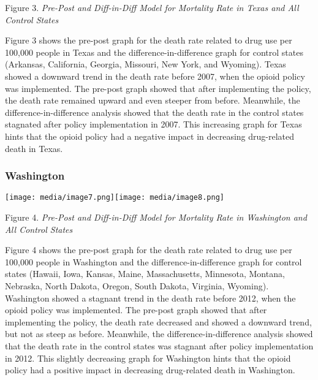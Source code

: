 \documentclass{article}
\begin{document}
Figure 3. \emph{Pre-Post and Diff-in-Diff Model for Mortality Rate in
Texas and All Control States}

Figure 3 shows the pre-post graph for the death rate related to drug use
per 100,000 people in Texas and the difference-in-difference graph for
control states (Arkansas, California, Georgia, Missouri, New York, and
Wyoming). Texas showed a downward trend in the death rate before 2007,
when the opioid policy was implemented. The pre-post graph showed that
after implementing the policy, the death rate remained upward and even
steeper from before. Meanwhile, the difference-in-difference analysis
showed that the death rate in the control states stagnated after policy
implementation in 2007. This increasing graph for Texas hints that the
opioid policy had a negative impact in decreasing drug-related death in
Texas.

\hypertarget{section}{%
\subsubsection{}\label{section}}

\hypertarget{washington}{%
\subsubsection{Washington}\label{washington}}

\texttt{[image: media/image7.png]}\texttt{[image: media/image8.png]}

Figure 4. \emph{Pre-Post and Diff-in-Diff Model for Mortality Rate in
Washington and All Control States}

Figure 4 shows the pre-post graph for the death rate related to drug use
per 100,000 people in Washington and the difference-in-difference graph
for control states (Hawaii, Iowa, Kansas, Maine, Massachusetts,
Minnesota, Montana, Nebraska, North Dakota, Oregon, South Dakota,
Virginia, Wyoming). Washington showed a stagnant trend in the death rate
before 2012, when the opioid policy was implemented. The pre-post graph
showed that after implementing the policy, the death rate decreased and
showed a downward trend, but not as steep as before. Meanwhile, the
difference-in-difference analysis showed that the death rate in the
control states was stagnant after policy implementation in 2012. This
slightly decreasing graph for Washington hints that the opioid policy
had a positive impact in decreasing drug-related death in Washington.
\end{document}
